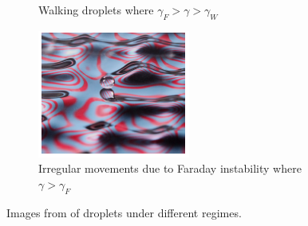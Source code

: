 \begin{figure}[b]
\begin{subfigure}{0.32\textwidth}
        \caption{Walking droplets where $\gamma_F > \gamma > \gamma_W$}
        \label{fig:walkingdroplets}
    \end{subfigure}
    \begin{subfigure}{0.32\textwidth}
        \includegraphics[width=\textwidth]{prototype/IrregularMotionExample.png}
        \caption{Irregular  movements due to Faraday instability where  $\gamma > \gamma_F $}
        \label{fig:faradaydroplets}
    \end{subfigure}
    \caption{Images from \cite{harris2017visualization} of droplets under different regimes.}
    \label{fig:dropletvisualisation}
\end{figure}


